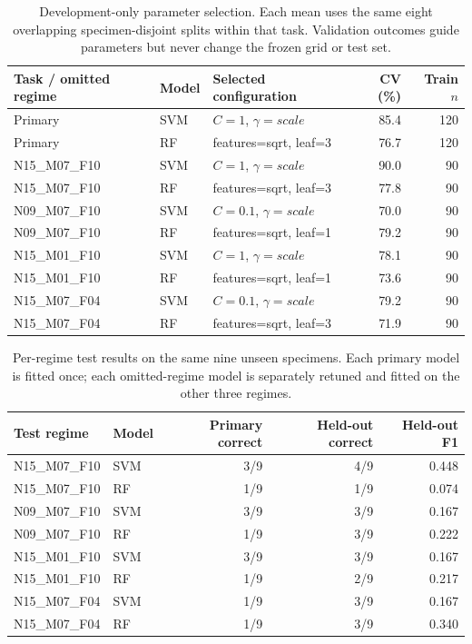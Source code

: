 \documentclass[11pt,a4paper]{article}
\begin{document}
\begin{table}[htbp]\centering\small
\caption{Development-only parameter selection. Each mean uses the same eight overlapping specimen-disjoint splits within that task. Validation outcomes guide parameters but never change the frozen grid or test set.}
\label{tab:bearing_configs}
\begin{tabular}{@{}lllrr@{}}\toprule
Task / omitted regime & Model & Selected configuration & CV (\%) & Train $n$ \\\midrule
Primary & SVM & $C=1$, $\gamma=scale$ & 85.4 & 120 \\
Primary & RF & features=sqrt, leaf=3 & 76.7 & 120 \\
N15\_M07\_F10 & SVM & $C=1$, $\gamma=scale$ & 90.0 & 90 \\
N15\_M07\_F10 & RF & features=sqrt, leaf=3 & 77.8 & 90 \\
N09\_M07\_F10 & SVM & $C=0.1$, $\gamma=scale$ & 70.0 & 90 \\
N09\_M07\_F10 & RF & features=sqrt, leaf=1 & 79.2 & 90 \\
N15\_M01\_F10 & SVM & $C=1$, $\gamma=scale$ & 78.1 & 90 \\
N15\_M01\_F10 & RF & features=sqrt, leaf=1 & 73.6 & 90 \\
N15\_M07\_F04 & SVM & $C=0.1$, $\gamma=scale$ & 79.2 & 90 \\
N15\_M07\_F04 & RF & features=sqrt, leaf=3 & 71.9 & 90 \\
\bottomrule\end{tabular}
\end{table}

\FloatBarrier

\begin{table}[htbp]\centering\small
\caption{Per-regime test results on the same nine unseen specimens. Each primary model is fitted once; each omitted-regime model is separately retuned and fitted on the other three regimes.}
\label{tab:bearing_regimes}
\begin{tabular}{@{}llrrr@{}}\toprule
Test regime & Model & Primary correct & Held-out correct & Held-out F1 \\\midrule
N15\_M07\_F10 & SVM & 3/9 & 4/9 & 0.448 \\
N15\_M07\_F10 & RF & 1/9 & 1/9 & 0.074 \\
N09\_M07\_F10 & SVM & 3/9 & 3/9 & 0.167 \\
N09\_M07\_F10 & RF & 1/9 & 3/9 & 0.222 \\
N15\_M01\_F10 & SVM & 3/9 & 3/9 & 0.167 \\
N15\_M01\_F10 & RF & 1/9 & 2/9 & 0.217 \\
N15\_M07\_F04 & SVM & 1/9 & 3/9 & 0.167 \\
N15\_M07\_F04 & RF & 1/9 & 3/9 & 0.340 \\
\bottomrule\end{tabular}
\end{table}
\end{document}
